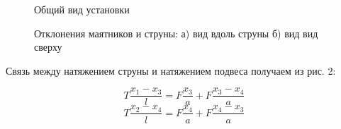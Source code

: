 \documentclass[14pt]{article}
\begin{document}
\begin{figure}[h!]
	\caption{Общий вид установки}
	\label{fig:image}
\end{figure}

\begin{figure}[h!]
	\caption{
		Отклонения маятников и струны:
		а) вид вдоль струны
		б) вид вид сверху	
	}
	\label{fig:image}
\end{figure}

Связь между натяжением струны и натяжением подвеса получаем из рис. 2:

\begin{equation}
T\frac{x_1 - x_3}{l} = F\frac{x_3}{a} + F\frac{x_3 - x_4}{a}
\end{equation}
\begin{equation}
T\frac{x_2 - x_4}{l} = F\frac{x_4}{a} + F\frac{x_4 - x_3}{a}
\end{equation}
\end{document}
